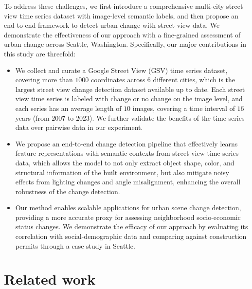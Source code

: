 \documentclass[letterpaper]{article} %
\begin{document}
To address these challenges, we first introduce a comprehensive multi-city street view time series dataset with image-level semantic labels, and then propose an end-to-end framework to detect urban change with street view data. We demonstrate the effectiveness of our approach with a fine-grained assessment of urban change across Seattle, Washington. Specifically, our major contributions in this study are threefold:
\begin{itemize}
    \item We collect and curate a Google Street View (GSV) time series dataset, covering more than $1000$ coordinates across $6$ different cities, which is the largest street view change detection dataset available up to date. Each street view time series is labeled with change or no change on the image level, and each series has an average length of $10$ images, covering a time interval of $16$ years (from $2007$ to $2023$). We further validate the benefits of the time series data over pairwise data in our experiment.
    \item We propose an end-to-end change detection pipeline that effectively learns feature representations with semantic contexts from street view time series data, which allows the model to not only extract object shape, color, and structural information of the built environment, but also mitigate noisy effects from lighting changes and angle misalignment, enhancing the overall robustness of the change detection.
    \item Our method enables scalable applications for urban scene change detection, providing a more accurate proxy for assessing neighborhood socio-economic status changes. We demonstrate the efficacy of our approach by evaluating its correlation with social-demographic data and comparing against construction permits through a case study in Seattle.
\end{itemize}

\section{Related work}
\end{document}
